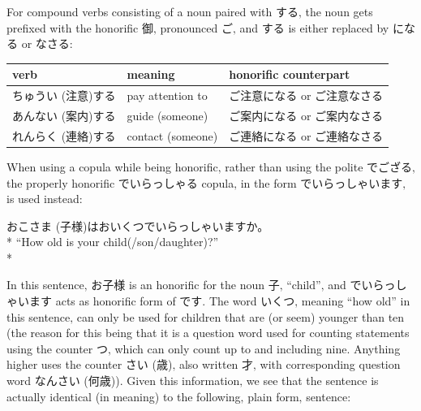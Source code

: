 \documentclass[11pt, b5paper, twoside, openright, onecolumn]{book}
\makeatletter
\newcommand*{\rtrubystack}[2]{{\relscale{0.5}%
  \begin{tabular}[b]{@{}c@{}}%
    {#1}\\%
    {\textscale{2}{#2}}%
  \end{tabular}}%
}
\DeclareRobustCommand*{\rtruby}[2]{%
  \mbox{%
    \setlength{\parskip}{0ex}%
    \BeginAccSupp{method=pdfstringdef,ActualText={#1}}%
      \rtrubystack{\phantom{#2}}{#1}%
      \llap{%
        \rtrubystack{#2}{\phantom{#1}}%
      }%
    \EndAccSupp{}%
  }%
}
\newcommand*{\rubystack}[2]{{\relscale{0.5}%
  \begin{tabular}[b]{@{}c@{}}%
    {#1}\\%
   {\textscale{2}{#2}}%
  \end{tabular}}%
}
\DeclareRobustCommand*{\ruby}[2]{%
  \mbox{%
    \setlength{\parskip}{0ex}%
    \BeginAccSupp{method=pdfstringdef,ActualText={#1}}%
      \rubystack{\phantom{#2}}{#1}%
      \llap{%
        \rubystack{#2}{\phantom{#1}}%
      }%
    \EndAccSupp{}%
  }%
}
\renewcommand*{\rtruby}[2]{#2 (#1)}%
\renewcommand*{\ruby}[2]{#2 (#1)}%
\newenvironment{exampleblock}{
\setlength{\parindent}{0.6in}
\begin{minipage}[t]{\dimexpr\textwidth-\parindent}}
{\end{minipage}}
\newenvironment{mytabular}[1]{\noindent\hspace{0.4in}
\begin{tabular}[h]{#1}}{\end{tabular}}
\makeatother
\begin{document}
\larger
\vspace{0.5cm}


For compound verbs consisting of a noun paired with する‚ the noun gets prefixed with the honorific 御‚ pronounced ご‚ and する is either replaced by になる or なさる:

\vspace{0.5cm}
\smaller
\begin{mytabular}{| l  l  l |}\hline 
\rule{0pt}{2.4ex}verb & meaning & honorific counterpart\\ 
\hline
\rule{0pt}{3.6ex}\rtruby{注意}{ちゅうい}する & pay attention to & ご注意になる or ご注意なさる\\ 
\rule{0pt}{3.6ex}\rtruby{案内}{あんない}する & guide (someone) & ご案内になる or ご案内なさる\\ 
\rule{0pt}{3.6ex}\rtruby{連絡}{れんらく}する & contact (someone) & ご連絡になる or ご連絡なさる\\ 
\hline 
\end{mytabular}
\larger
\vspace{0.5cm}


When using a copula while being honorific‚ rather than using the polite でござる‚ the properly honorific でいらっしゃる copula‚ in the form でいらっしゃいます‚ is used instead:

\vspace{0.4cm}
\begin{exampleblock}
お\ruby{子様}{こさま}はおいくつでいらっしゃいますか。 \\* 
“How old is your child(/son/daughter)?” \\* 
\end{exampleblock}
\vspace{0.2cm}

In this sentence‚ お子様 is an honorific for the noun 子‚ “child”‚ and でいらっしゃいます acts as honorific form of です. The word いくつ‚ meaning “how old” in this sentence‚ can only be used for children that are (or seem) younger than ten (the reason for this being that it is a question word used for counting statements using the counter つ‚ which can only count up to and including nine. Anything higher uses the counter \ruby{歳}{さい}‚ also written 才‚ with corresponding question word \ruby{何歳}{なんさい}). Given this information‚ we see that the sentence is actually identical (in meaning) to the following‚ plain form‚ sentence:
\end{document}
